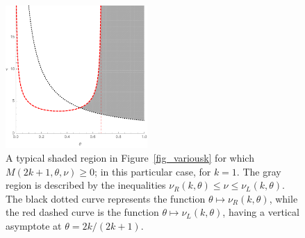 \documentclass[smallextended,numbook,runningheads]{svjour3}     %
\newcommand{\te}{\theta}
\newcommand{\nul}{\nu_L(k,\theta)}
\newcommand{\nur}{\nu_R(k,\theta)}
\begin{document}
\begin{figure}
\begin{center}
\includegraphics[width=0.48\textwidth]{fig_boundary.pdf}
\caption{A typical shaded region in Figure~\ref{fig_variousk} for which $M(2k+1,\te,\nu)\ge 0$; in this particular case, for $k=1$. The gray region is described by the inequalities $\nur\le\nu\le\nul$. The black dotted curve represents the function $\te\mapsto\nur$, while the red dashed curve is the function
$\te\mapsto\nul$, having a vertical asymptote at $\te=2k/(2k+1)$.}\label{fig_boundary}
\end{center}
\end{figure}
\end{document}
